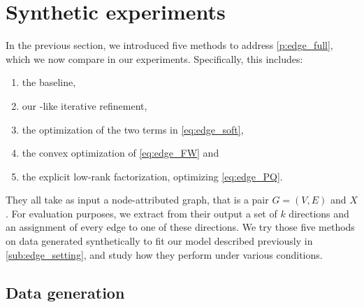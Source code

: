 \section{Synthetic experiments}
\label{sec:edge_exp}

In the previous section, we introduced five methods to address \autoref{p:edge_full}, which we now
compare in our experiments. Specifically, this includes:
\begin{enumerate}[1.,nosep]
\item the \kmeans{} baseline,
\item our \lloyd{}-like iterative refinement,
\item the \combined{} optimization of the two terms in \eqref{eq:edge_soft},
\item the \fwa{} convex optimization of \eqref{eq:edge_FW} and
\item the \pqt{} explicit low-rank factorization, optimizing \eqref{eq:edge_PQ}.
\end{enumerate}
They all take as input a node-attributed graph, that is a pair $G=(V, E)$ and $X$.
For evaluation purposes, we extract from their output a set of $k$ directions and an
assignment of every edge to one of these directions.
We try those five methods on data generated synthetically to fit our model described previously in
\autoref{sub:edge_setting}, and study how they perform under various conditions.

\subsection{Data generation}
\label{sub:edge_generation}

